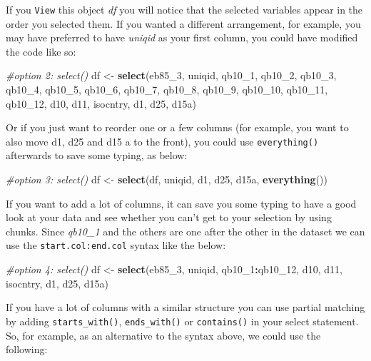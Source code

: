 \documentclass[
]{book}
\newenvironment{Shaded}{\begin{snugshade}}{\end{snugshade}}
\newcommand{\CommentTok}[1]{\textcolor[rgb]{0.56,0.35,0.01}{\textit{#1}}}
\newcommand{\FunctionTok}[1]{\textcolor[rgb]{0.13,0.29,0.53}{\textbf{#1}}}
\newcommand{\NormalTok}[1]{#1}
\newcommand{\OtherTok}[1]{\textcolor[rgb]{0.56,0.35,0.01}{#1}}
\newcommand{\SpecialCharTok}[1]{\textcolor[rgb]{0.81,0.36,0.00}{\textbf{#1}}}
\begin{document}
If you \texttt{View} this object \emph{df} you will notice that the selected variables appear in the order you selected them. If you wanted a different arrangement, for example, you may have preferred to have \emph{uniqid} as your first column, you could have modified the code like so:

\begin{Shaded}
\begin{Highlighting}[]
\CommentTok{\#option 2: select()}
\NormalTok{df }\OtherTok{\textless{}{-}} \FunctionTok{select}\NormalTok{(eb85\_3, uniqid, qb10\_1, qb10\_2, qb10\_3, qb10\_4,}
\NormalTok{             qb10\_5, qb10\_6, qb10\_7, qb10\_8, qb10\_9,}
\NormalTok{             qb10\_10, qb10\_11, qb10\_12, d10, d11,}
\NormalTok{             isocntry, d1, d25, d15a)}
\end{Highlighting}
\end{Shaded}

Or if you just want to reorder one or a few columns (for example, you want to also move d1, d25 and d15 a to the front), you could use \texttt{everything()} afterwards to save some typing, as below:

\begin{Shaded}
\begin{Highlighting}[]
\CommentTok{\#option 3: select()}
\NormalTok{df }\OtherTok{\textless{}{-}} \FunctionTok{select}\NormalTok{(df, uniqid, d1, d25, d15a, }\FunctionTok{everything}\NormalTok{())}
\end{Highlighting}
\end{Shaded}

If you want to add a lot of columns, it can save you some typing to have a good look at your data and see whether you can't get to your selection by using chunks. Since \emph{qb10\_1} and the others are one after the other in the dataset we can use the \texttt{start.col:end.col} syntax like the below:

\begin{Shaded}
\begin{Highlighting}[]
\CommentTok{\#option 4: select()}
\NormalTok{df }\OtherTok{\textless{}{-}} \FunctionTok{select}\NormalTok{(eb85\_3, uniqid, qb10\_1}\SpecialCharTok{:}\NormalTok{qb10\_12, d10, d11,}
\NormalTok{             isocntry, d1, d25, d15a)}
\end{Highlighting}
\end{Shaded}

If you have a lot of columns with a similar structure you can use partial matching by adding \texttt{starts\_with()}, \texttt{ends\_with()} or \texttt{contains()} in your select statement. So, for example, as an alternative to the syntax above, we could use the following:
\end{document}
